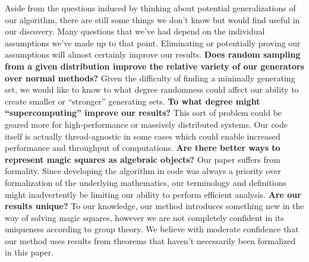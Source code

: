 \documentclass[12pt]{report}
\begin{document}
\indent Aside from the questions induced by thinking about potential generalizations of our
algorithm, there are still some things we don't know but would find useful in our discovery. Many
questions that we've had depend on the individual assumptions we've made up to that point.
Eliminating or potentially proving our assumptions will almost certainly improve our results.
\linebreak
\linebreak
\textbf{Does random sampling from a given distribution improve the relative variety of our
  generators over normal methods?} Given the difficulty of finding a minimally generating set, we
would like to know to what degree randomness could affect our ability to create smaller or
``stronger'' generating sets.
\linebreak
\linebreak
\textbf{To what degree might ``supercomputing'' improve our results?} This sort of problem could be
geared more for high-performance or massively distributed systems. Our code itself is actually
thread-agnostic in some cases which could enable increased performance and throughput of
computations.
\linebreak
\linebreak
\textbf{Are there better ways to represent magic squares as algebraic objects?} Our paper suffers
from formality. Since developing the algorithm in code was always a priority over formalization of
the underlying mathematics, our terminology and definitions might inadvertently be limiting our
ability to perform efficient analysis.
\linebreak
\linebreak
\textbf{Are our results unique?} To our knowledge, our method introduces something new in the way
of solving magic squares, however we are not completely confident in its uniqueness according to
group theory. We believe with moderate confidence that our method uses results from theorems that
haven't necessarily been formalized in this paper.

\nocite{*}
\printbibliography{}
\end{document}
